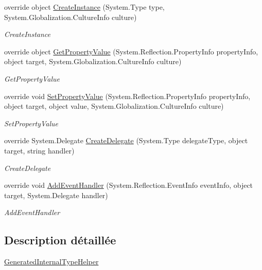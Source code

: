 \begin{DoxyCompactItemize}
override object \hyperlink{class_xaml_generated_namespace_1_1_generated_internal_type_helper_aefb7a98fceb9c287cef4756942f441d1}{Create\+Instance} (System.\+Type type, System.\+Globalization.\+Culture\+Info culture)
\begin{DoxyCompactList}\small\item\em Create\+Instance \end{DoxyCompactList}\item 
override object \hyperlink{class_xaml_generated_namespace_1_1_generated_internal_type_helper_afdc9fe15b56607d02082908d934480c6}{Get\+Property\+Value} (System.\+Reflection.\+Property\+Info property\+Info, object target, System.\+Globalization.\+Culture\+Info culture)
\begin{DoxyCompactList}\small\item\em Get\+Property\+Value \end{DoxyCompactList}\item 
override void \hyperlink{class_xaml_generated_namespace_1_1_generated_internal_type_helper_ade0f04c0f7b18dd5b170e071d5534d38}{Set\+Property\+Value} (System.\+Reflection.\+Property\+Info property\+Info, object target, object value, System.\+Globalization.\+Culture\+Info culture)
\begin{DoxyCompactList}\small\item\em Set\+Property\+Value \end{DoxyCompactList}\item 
override System.\+Delegate \hyperlink{class_xaml_generated_namespace_1_1_generated_internal_type_helper_a8ec4c37e82d9f4e867e9655f4eac3a78}{Create\+Delegate} (System.\+Type delegate\+Type, object target, string handler)
\begin{DoxyCompactList}\small\item\em Create\+Delegate \end{DoxyCompactList}\item 
override void \hyperlink{class_xaml_generated_namespace_1_1_generated_internal_type_helper_a73471f4a6d1ca4c4fceec9ad8610f0c8}{Add\+Event\+Handler} (System.\+Reflection.\+Event\+Info event\+Info, object target, System.\+Delegate handler)
\begin{DoxyCompactList}\small\item\em Add\+Event\+Handler \end{DoxyCompactList}\end{DoxyCompactItemize}


\subsection{Description détaillée}
\hyperlink{class_xaml_generated_namespace_1_1_generated_internal_type_helper}{Generated\+Internal\+Type\+Helper} 



